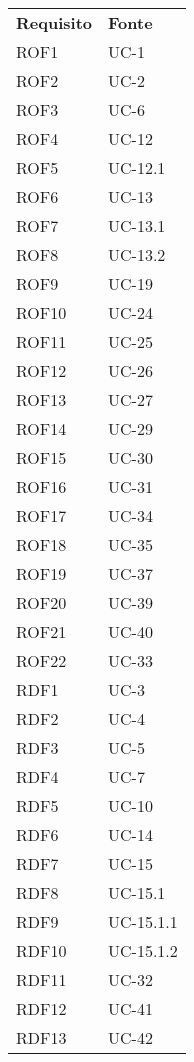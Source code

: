 \begin{longtable}{| p{5cm} | p{5cm} |}
		\rowcolor{LightBlue}
		\color{white}\bfseries Requisito & \color{white}\bfseries Fonte \\[0.25cm]
		\rowcolor{LightGray}
		ROF1 & UC-1\\
		ROF2 & UC-2\\
		\rowcolor{LightGray}
		ROF3 & UC-6\\
		ROF4 & UC-12\\
		\rowcolor{LightGray}
		ROF5 & UC-12.1\\
		ROF6 & UC-13\\
		\rowcolor{LightGray}
		ROF7 & UC-13.1\\
		ROF8 & UC-13.2\\
		\rowcolor{LightGray}
		ROF9 & UC-19\\
		ROF10 & UC-24\\
		\rowcolor{LightGray}
		ROF11 & UC-25\\
		ROF12 & UC-26\\
		\rowcolor{LightGray}
		ROF13 & UC-27\\
		ROF14 & UC-29\\
		\rowcolor{LightGray}
		ROF15 & UC-30\\
		ROF16 & UC-31\\
		\rowcolor{LightGray}
		ROF17 & UC-34\\
		ROF18 & UC-35\\
		\rowcolor{LightGray}
		ROF19 & UC-37\\
		ROF20 & UC-39\\
		\rowcolor{LightGray}
		ROF21 & UC-40\\
		ROF22 & UC-33\\
		RDF1 & UC-3\\
		\rowcolor{LightGray}
		RDF2 & UC-4\\
		RDF3 & UC-5\\
		\rowcolor{LightGray}
		RDF4 & UC-7\\
		RDF5 & UC-10\\
		\rowcolor{LightGray}
		RDF6 & UC-14\\
		RDF7 & UC-15\\
		\rowcolor{LightGray}
		RDF8 & UC-15.1\\
		RDF9 & UC-15.1.1\\
		\rowcolor{LightGray}
		RDF10 & UC-15.1.2\\
		RDF11 & UC-32\\
		\rowcolor{LightGray}
		RDF12 & UC-41\\
		RDF13 & UC-42\\

\end{longtable}
